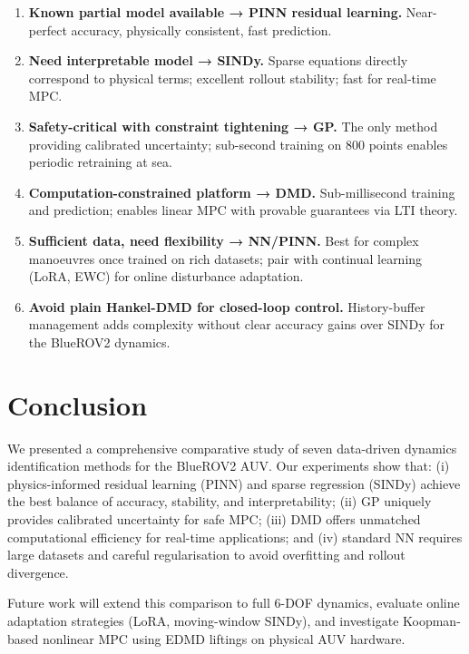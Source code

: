 \documentclass[conference]{IEEEtran}
\begin{document}
\begin{enumerate}
  \item \textbf{Known partial model available → PINN residual learning.}
        Near-perfect accuracy, physically consistent, fast prediction.
  \item \textbf{Need interpretable model → SINDy.}
        Sparse equations directly correspond to physical terms; excellent
        rollout stability; fast for real-time MPC.
  \item \textbf{Safety-critical with constraint tightening → GP.}
        The only method providing calibrated uncertainty; sub-second training
        on 800 points enables periodic retraining at sea.
  \item \textbf{Computation-constrained platform → DMD.}
        Sub-millisecond training and prediction; enables linear MPC with
        provable guarantees via LTI theory.
  \item \textbf{Sufficient data, need flexibility → NN/PINN.}
        Best for complex manoeuvres once trained on rich datasets; pair with
        continual learning (LoRA, EWC) for online disturbance adaptation.
  \item \textbf{Avoid plain Hankel-DMD for closed-loop control.}
        History-buffer management adds complexity without clear accuracy
        gains over SINDy for the BlueROV2 dynamics.
\end{enumerate}

\section{Conclusion}
\label{sec:conclusion}

We presented a comprehensive comparative study of seven data-driven dynamics
identification methods for the BlueROV2 AUV. Our experiments show that:
(i) physics-informed residual learning (PINN) and sparse regression (SINDy)
achieve the best balance of accuracy, stability, and interpretability;
(ii) GP uniquely provides calibrated uncertainty for safe MPC;
(iii) DMD offers unmatched computational efficiency for real-time applications;
and (iv) standard NN requires large datasets and careful regularisation to
avoid overfitting and rollout divergence.

Future work will extend this comparison to full 6-DOF dynamics, evaluate
online adaptation strategies (LoRA, moving-window SINDy), and investigate
Koopman-based nonlinear MPC using EDMD liftings on physical AUV hardware.
\end{document}
